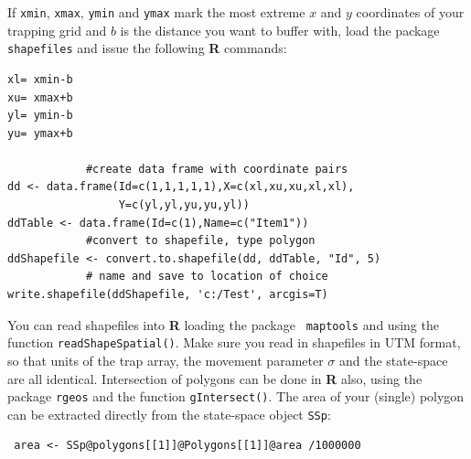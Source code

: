 If \mbox{\tt xmin}, \mbox{\tt xmax}, \mbox{\tt ymin} and 
\mbox{\tt ymax} mark the most extreme
$x$ and $y$ coordinates of your 
trapping grid and $b$ is the distance you want to buffer with, load the 
package \mbox{\tt shapefiles} \citep{stabler:2006} and issue the following
{\bf R} commands:
\begin{verbatim}
xl= xmin-b
xu= xmax+b
yl= ymin-b
yu= ymax+b

            #create data frame with coordinate pairs
dd <- data.frame(Id=c(1,1,1,1,1),X=c(xl,xu,xu,xl,xl), 
				 Y=c(yl,yl,yu,yu,yl)) 
ddTable <- data.frame(Id=c(1),Name=c("Item1"))
            #convert to shapefile, type polygon
ddShapefile <- convert.to.shapefile(dd, ddTable, "Id", 5) 
            # name and save to location of choice
write.shapefile(ddShapefile, 'c:/Test', arcgis=T) 
\end{verbatim}

You can read shapefiles into {\bf R} loading the package \mbox{\tt 
maptools}
\citep{lewin-koh_etal:2011} and using the function
\verb#readShapeSpatial()#. Make sure you read in shapefiles in UTM format, so
that units of the trap array, the movement parameter $\sigma$ and the
state-space are all identical. 
Intersection of polygons can be done
in {\bf R} also, using the package \mbox{\tt rgeos} 
\citep{bivand_rundel:2011} and the
function \verb#gIntersect()#. 
The area of your (single) polygon can be
extracted directly from the state-space object \mbox{\tt SSp}:

\begin{verbatim}
 area <- SSp@polygons[[1]]@Polygons[[1]]@area /1000000
\end{verbatim}

